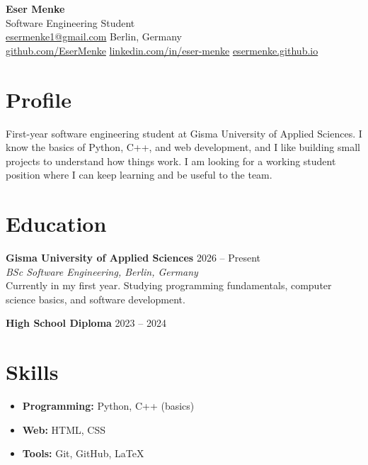 \documentclass[11pt,a4paper]{article}
\begin{document}
\begin{center}
  {\Huge\bfseries Eser Menke}\\[6pt]
  {\large\color{soft} Software Engineering Student}\\[8pt]
  \small
  \href{mailto:esermenke1@gmail.com}{esermenke1@gmail.com} \quad\textbar\quad
  Berlin, Germany \\[2pt]
  \href{https://github.com/EserMenke}{github.com/EserMenke} \quad\textbar\quad
  \href{https://www.linkedin.com/in/eser-menke-710482403/}{linkedin.com/in/eser-menke} \quad\textbar\quad
  \href{https://esermenke.github.io}{esermenke.github.io}
\end{center}

\vspace{6pt}

\section{Profile}
First-year software engineering student at Gisma University of Applied Sciences. I know the
basics of Python, C++, and web development, and I like building small projects to understand
how things work. I am looking for a working student position where I can keep learning and be
useful to the team.

\section{Education}

\noindent\textbf{Gisma University of Applied Sciences} \hfill \textcolor{soft}{2026 -- Present}\\
\textit{BSc Software Engineering, Berlin, Germany}\\[3pt]
Currently in my first year. Studying programming fundamentals, computer science basics, and
software development.

\vspace{8pt}

\noindent\textbf{High School Diploma} \hfill \textcolor{soft}{2023 -- 2024}

\section{Skills}
\begin{itemize}[leftmargin=1.2em, itemsep=2pt, topsep=2pt]
  \item \textbf{Programming:} Python, C++ (basics)
  \item \textbf{Web:} HTML, CSS
  \item \textbf{Tools:} Git, GitHub, LaTeX
\end{itemize}
\end{document}
